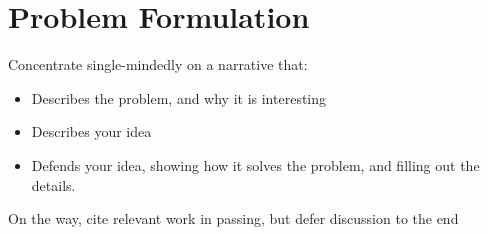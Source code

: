 
\section{Problem Formulation}
\label{sec:problem-formulation}

Concentrate single-mindedly on a narrative that:
\begin{itemize}
\item Describes the problem, and why it is interesting
\item Describes your idea
\item Defends your idea, showing how it solves the problem, and filling out the details.
\end{itemize}
On the way, cite relevant work in passing, but defer discussion to the end

